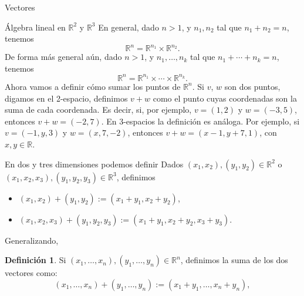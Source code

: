 \documentclass[a4paper,12pt,twoside,spanish,reqno]{amsbook}
\theoremstyle{definition}
\newtheorem{definicion}{Definici\'on}[section]
\theoremstyle{remark}
\newcommand{\R}{\mathbb R}
\begin{document}
\begin{chapter}{Vectores}
\begin{section}{Álgebra lineal en $\R^2$ y $\R^3$}
        En  general, dado $n>1$, y $n_1,n_2$ tal que $n_1+n_2 = n$, tenemos
        \begin{equation*}
        \R^n= \R^{n_1} \times \R^{n_2}.
        \end{equation*} 
        De forma más general aún,  dado $n>1$, y $n_1,\ldots,n_k$ tal que $n_1+\cdots+n_k = n$, tenemos
        \begin{equation*}
        \R^n= \R^{n_1} \times \cdots\times \R^{n_k}.
        \end{equation*} 	
        Ahora vamos a definir cómo sumar los puntos de $\R^n$. Si $v$, $w$ son dos puntos, digamos en el 2-espacio,  definimos $v + w$ como el punto cuyas coordenadas son la suma de cada coordenada. Es decir, si, por ejemplo,  $v= (1, 2)$ y $w= (- 3, 5)$, entonces $v+w = (- 2, 7)$. En 3-espacios la definición es análoga. Por  ejemplo, si $v= (- 1, y, 3)$ y $w= (x, 7, - 2)$, entonces $v+w = (x - 1, y + 7, 1)$, con $x,y \in \R$.
        
        En  dos y tres dimensiones podemos definir
            Dados $(x_1,x_2), (y_1,y_2) \in \R^2$ o $(x_1,x_2,x_3), (y_1,y_2,y_3) \in \R^3$, definimos
        \begin{itemize}
            \item $(x_1,x_2)+ (y_1,y_2):=(x_1+y_1,x_2+y_2)$, 
            \item $(x_1,x_2,x_3)+ (y_1,y_2,y_3):=(x_1+y_1,x_2+y_2,x_3+y_3)$.
        \end{itemize}
        
        Generalizando, 
            \begin{definicion}
            Si $(x_1,\ldots,x_n), (y_1,\ldots,y_n) \in \R^n$, definimos la suma de los dos vectores como: 
                    \begin{equation*}
                    (x_1,\ldots,x_n)+ (y_1,\ldots,y_n):=(x_1+y_1,\ldots,x_n+y_n), 
                \end{equation*}
            \end{definicion}
            

\end{section}
\end{chapter}
\end{document}
